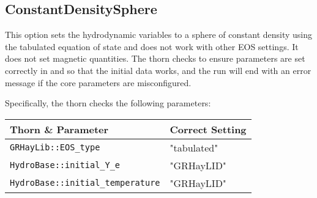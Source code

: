 \documentclass{article}
\begin{document}
\subsection{ConstantDensitySphere}

This option sets the hydrodynamic variables to a sphere of constant
density using the tabulated equation of state and does not work
with other EOS settings. It does not set magnetic quantities. The thorn
checks to ensure parameters are set correctly in \glib and
\hbase so that the initial data works, and the run will end
with an error message if the core parameters are misconfigured.

Specifically, the thorn checks the following parameters:
\begin{tabular}{l|l}
Thorn \& Parameter & Correct Setting \\\hline
\texttt{GRHayLib::EOS\_type} & "tabulated" \\
\texttt{HydroBase::initial\_Y\_e} & "GRHayLID" \\
\texttt{HydroBase::initial\_temperature} & "GRHayLID"
\end{tabular}

\end{document}
